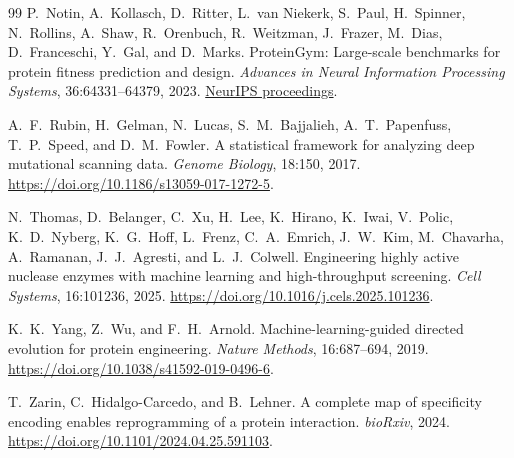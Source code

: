 \begin{thebibliography}{99}
P.~Notin, A.~Kollasch, D.~Ritter, L.~van Niekerk, S.~Paul, H.~Spinner,
N.~Rollins, A.~Shaw, R.~Orenbuch, R.~Weitzman, J.~Frazer, M.~Dias,
D.~Franceschi, Y.~Gal, and D.~Marks.
\newblock ProteinGym: Large-scale benchmarks for protein fitness prediction and design.
\newblock \emph{Advances in Neural Information Processing Systems},
36:64331--64379, 2023.
\newblock \href{https://proceedings.neurips.cc/paper_files/paper/2023/hash/cac723e5ff29f65e3fcbb0739ae91bee-Abstract-Datasets_and_Benchmarks.html}{NeurIPS proceedings}.

A.~F.~Rubin, H.~Gelman, N.~Lucas, S.~M.~Bajjalieh, A.~T.~Papenfuss,
T.~P.~Speed, and D.~M.~Fowler.
\newblock A statistical framework for analyzing deep mutational scanning data.
\newblock \emph{Genome Biology}, 18:150, 2017.
\newblock \url{https://doi.org/10.1186/s13059-017-1272-5}.

N.~Thomas, D.~Belanger, C.~Xu, H.~Lee, K.~Hirano, K.~Iwai, V.~Polic,
K.~D.~Nyberg, K.~G.~Hoff, L.~Frenz, C.~A.~Emrich, J.~W.~Kim,
M.~Chavarha, A.~Ramanan, J.~J.~Agresti, and L.~J.~Colwell.
\newblock Engineering highly active nuclease enzymes with machine learning
and high-throughput screening.
\newblock \emph{Cell Systems}, 16:101236, 2025.
\newblock \url{https://doi.org/10.1016/j.cels.2025.101236}.

K.~K.~Yang, Z.~Wu, and F.~H.~Arnold.
\newblock Machine-learning-guided directed evolution for protein engineering.
\newblock \emph{Nature Methods}, 16:687--694, 2019.
\newblock \url{https://doi.org/10.1038/s41592-019-0496-6}.

T.~Zarin, C.~Hidalgo-Carcedo, and B.~Lehner.
\newblock A complete map of specificity encoding enables reprogramming of a
protein interaction.
\newblock \emph{bioRxiv}, 2024.
\newblock \url{https://doi.org/10.1101/2024.04.25.591103}.

\end{thebibliography}

